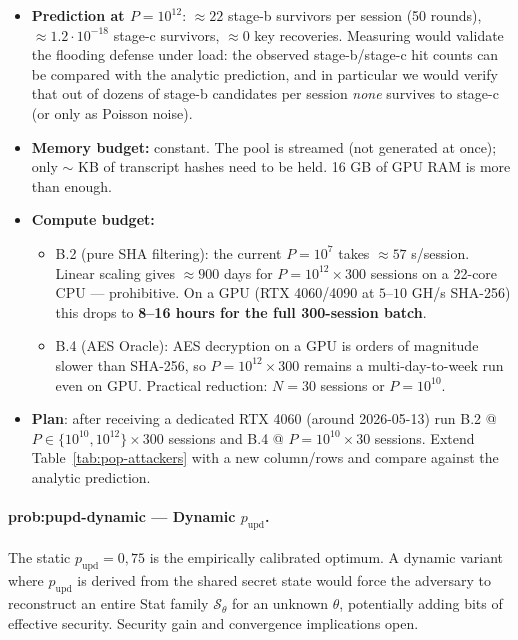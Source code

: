 \documentclass[11pt,a4paper]{article}
\begin{document}
\begin{itemize}[leftmargin=*]
\item \textbf{Prediction at $P = 10^{12}$}: $\approx 22$ stage-b survivors per session (50 rounds), $\approx 1{.}2 \cdot 10^{-18}$ stage-c survivors, $\approx 0$ key recoveries. Measuring would validate the flooding defense under load: the observed stage-b/stage-c hit counts can be compared with the analytic prediction, and in particular we would verify that out of dozens of stage-b candidates per session \emph{none} survives to stage-c (or only as Poisson noise).
\item \textbf{Memory budget:} constant. The pool is streamed (not generated at once); only $\sim$ KB of transcript hashes need to be held. 16 GB of GPU RAM is more than enough.
\item \textbf{Compute budget:}
\begin{itemize}[leftmargin=*]
\item B.2 (pure SHA filtering): the current $P = 10^7$ takes $\approx 57$ s/session. Linear scaling gives $\approx 900$ days for $P = 10^{12} \times 300$ sessions on a 22-core CPU --- prohibitive. On a GPU (RTX 4060/4090 at $5$--$10$ GH/s SHA-256) this drops to \textbf{8--16 hours for the full 300-session batch}.
\item B.4 (AES Oracle): AES decryption on a GPU is orders of magnitude slower than SHA-256, so $P = 10^{12} \times 300$ remains a multi-day-to-week run even on GPU. Practical reduction: $N = 30$ sessions or $P = 10^{10}$.
\end{itemize}
\item \textbf{Plan}: after receiving a dedicated RTX 4060 (around 2026-05-13) run B.2 @ $P \in \{10^{10}, 10^{12}\} \times 300$ sessions and B.4 @ $P = 10^{10} \times 30$ sessions. Extend Table~\ref{tab:pop-attackers} with a new column/rows and compare against the analytic prediction.
\end{itemize}

\paragraph{prob:pupd-dynamic --- Dynamic $p_\text{upd}$.} The static $p_\text{upd} = 0{,}75$ is the empirically calibrated optimum. A dynamic variant where $p_\text{upd}$ is derived from the shared secret state would force the adversary to reconstruct an entire Stat family $\mathcal{S}_\theta$ for an unknown $\theta$, potentially adding bits of effective security. Security gain and convergence implications open.
\end{document}
